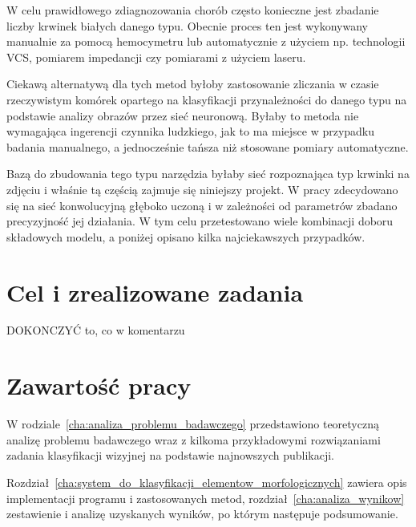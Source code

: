W celu prawidłowego zdiagnozowania chorób często konieczne jest zbadanie liczby krwinek białych danego typu. Obecnie proces ten jest wykonywany manualnie za pomocą hemocymetru lub automatycznie z użyciem np. technologii VCS, pomiarem impedancji czy pomiarami z użyciem laseru. 

Ciekawą alternatywą dla tych metod byłoby zastosowanie zliczania w czasie rzeczywistym komórek opartego na klasyfikacji przynależności do danego typu na podstawie analizy obrazów przez sieć neuronową. Byłaby to metoda nie wymagająca ingerencji czynnika ludzkiego, jak to ma miejsce w przypadku badania manualnego, a jednocześnie tańsza niż stosowane pomiary automatyczne.

Bazą do zbudowania tego typu narzędzia byłaby sieć rozpoznająca typ krwinki na zdjęciu i właśnie tą częścią zajmuje się niniejszy projekt. W pracy zdecydowano się na sieć konwolucyjną głęboko uczoną i w zależności od parametrów zbadano precyzyjność jej działania. W tym celu przetestowano wiele kombinacji doboru składowych modelu, a poniżej opisano kilka najciekawszych przypadków.

\section{Cel i zrealizowane zadania}
\label{sec:cel_i_zrealizowane_zadania}

DOKONCZYĆ to, co w komentarzu

\section{Zawartość pracy}
\label{sec:zawartosc_pracy}

W rodziale~\ref{cha:analiza_problemu_badawczego} przedstawiono teoretyczną analizę problemu badawczego wraz z kilkoma przykładowymi rozwiązaniami zadania klasyfikacji wizyjnej na podstawie najnowszych publikacji. 

Rozdział~\ref{cha:system_do_klasyfikacji_elementow_morfologicznych} zawiera opis implementacji programu i zastosowanych metod, rozdział~\ref{cha:analiza_wynikow} zestawienie i analizę uzyskanych wyników, po którym następuje podsumowanie.
